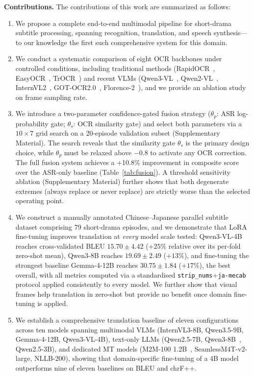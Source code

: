 \documentclass[journal]{IEEEtran}
\begin{document}
\textbf{Contributions.}
The contributions of this work are summarized as follows:
\begin{enumerate}
 \item We propose a complete end-to-end multimodal pipeline for short-drama subtitle processing, spanning recognition, translation, and speech synthesis---to our knowledge the first such comprehensive system for this domain.
 \item We conduct a systematic comparison of eight OCR backbones under controlled conditions, including traditional methods (RapidOCR~\cite{rapidocr2022}, EasyOCR~\cite{easyocr2020}, TrOCR~\cite{li2021trocr}) and recent VLMs (Qwen3-VL~\cite{qwen3vl2025}, Qwen2-VL~\cite{wang2024qwen2}, InternVL2~\cite{chen2024internvl}, GOT-OCR2.0~\cite{wang2024gotocr}, Florence-2~\cite{florence2_2024}), and we provide an ablation study on frame sampling rate.
 \item We introduce a two-parameter confidence-gated fusion strategy ($\theta_p$: ASR log-probability gate; $\theta_s$: OCR similarity gate) and select both parameters via a $10 \times 7$ grid search on a 20-episode validation subset (Supplementary Material). The search reveals that the similarity gate $\theta_s$ is the primary design choice, while $\theta_p$ must be relaxed above $-0.8$ to activate any OCR correction. The full fusion system achieves a +10.8\% improvement in composite score over the ASR-only baseline (Table~\ref{tab:fusion}). A threshold sensitivity ablation (Supplementary Material) further shows that both degenerate extremes (always replace or never replace) are strictly worse than the selected operating point.
 \item We construct a manually annotated Chinese--Japanese parallel subtitle dataset comprising 79 short-drama episodes, and we demonstrate that LoRA fine-tuning improves translation at \emph{every} model scale tested: Qwen3-VL-4B reaches cross-validated BLEU $15.70\pm4.42$ ($+25\%$ relative over its per-fold zero-shot mean), Qwen3-8B reaches $19.69\pm2.49$ ($+13\%$), and fine-tuning the strongest baseline Gemma-4-12B reaches $30.75\pm1.84$ ($+17\%$), the best overall, with all metrics computed via a standardised \texttt{strip\_nums}+\texttt{ja-mecab} protocol applied consistently to every model. We further show that visual frames help translation in zero-shot but provide no benefit once domain fine-tuning is applied.
 \item We establish a comprehensive translation baseline of eleven configurations across ten models spanning multimodal VLMs (InternVL3-8B, Qwen3.5-9B, Gemma-4-12B, Qwen3-VL-4B), text-only LLMs (Qwen2.5-7B, Qwen3-8B~\cite{qwen3_2025}, Qwen2.5-3B), and dedicated MT models (M2M-100 1.2B~\cite{fan2021beyond}, SeamlessM4T-v2-large, NLLB-200), showing that domain-specific fine-tuning of a 4B model outperforms nine of eleven baselines on BLEU and chrF++.

\end{enumerate}
\end{document}

